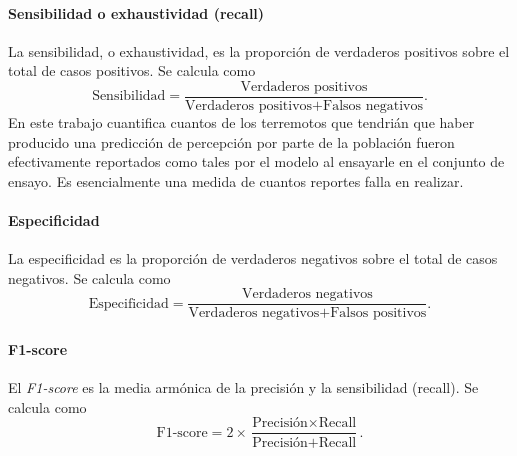 \documentclass[a4paper]{report}
\begin{document}
\paragraph{Sensibilidad o exhaustividad (recall)}
La sensibilidad, o exhaustividad, es la proporción de verdaderos positivos sobre el total de casos positivos.
Se calcula como
\begin{equation}
	\text{Sensibilidad} = \frac{\text{Verdaderos positivos}}{\text{Verdaderos positivos} + \text{Falsos negativos}}.
\end{equation}
En este trabajo cuantifica cuantos de los terremotos que tendrián que haber producido una predicción de percepción por parte de la población fueron efectivamente reportados como tales por el modelo al ensayarle en el conjunto de ensayo.
Es esencialmente una medida de cuantos reportes falla en realizar.


\paragraph{Especificidad}
La especificidad es la proporción de verdaderos negativos sobre el total de casos negativos.
Se calcula como
\begin{equation}
	\text{Especificidad} = \frac{\text{Verdaderos negativos}}{\text{Verdaderos negativos} + \text{Falsos positivos}}.
\end{equation}


\paragraph{F1-score}
El \emph{F1-score} es la media armónica de la precisión y la sensibilidad (recall).
Se calcula como
\begin{equation}
	\text{F1-score} = 2 \times \frac{\text{Precisión} \times \text{Recall}}{\text{Precisión} + \text{Recall}}.
\end{equation}
\end{document}

